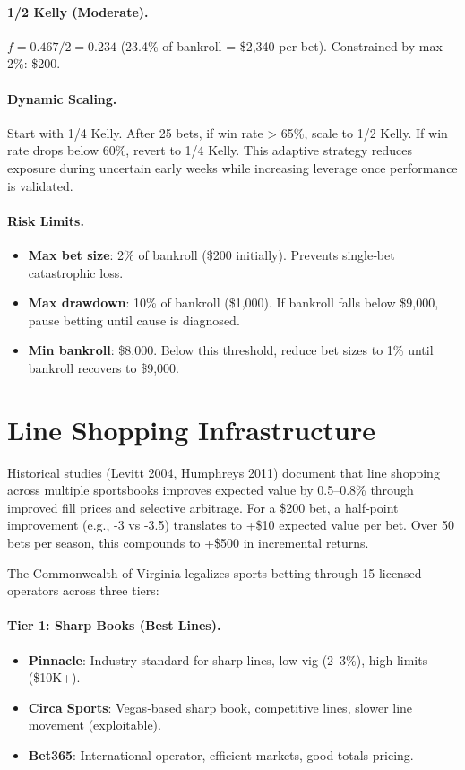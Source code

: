 \paragraph{1/2 Kelly (Moderate).}
$f = 0.467 / 2 = 0.234$ (23.4\% of bankroll = \$2,340 per bet). Constrained by max 2\%: \$200.

\paragraph{Dynamic Scaling.}
Start with 1/4 Kelly. After 25 bets, if win rate > 65\%, scale to 1/2 Kelly. If win rate drops below 60\%, revert to 1/4 Kelly. This adaptive strategy reduces exposure during uncertain early weeks while increasing leverage once performance is validated.

\paragraph{Risk Limits.}
\begin{itemize}
\item \textbf{Max bet size}: 2\% of bankroll (\$200 initially). Prevents single‑bet catastrophic loss.
\item \textbf{Max drawdown}: 10\% of bankroll (\$1,000). If bankroll falls below \$9,000, pause betting until cause is diagnosed.
\item \textbf{Min bankroll}: \$8,000. Below this threshold, reduce bet sizes to 1\% until bankroll recovers to \$9,000.
\end{itemize}

\section{Line Shopping Infrastructure}
\label{sec:line_shopping}

Historical studies (Levitt 2004, Humphreys 2011) document that line shopping across multiple sportsbooks improves expected value by 0.5--0.8\% through improved fill prices and selective arbitrage. For a \$200 bet, a half‑point improvement (e.g., -3 vs -3.5) translates to +\$10 expected value per bet. Over 50 bets per season, this compounds to +\$500 in incremental returns.

The Commonwealth of Virginia legalizes sports betting through 15 licensed operators across three tiers:

\paragraph{Tier 1: Sharp Books (Best Lines).}
\begin{itemize}
\item \textbf{Pinnacle}: Industry standard for sharp lines, low vig (2--3\%), high limits (\$10K+).
\item \textbf{Circa Sports}: Vegas‑based sharp book, competitive lines, slower line movement (exploitable).
\item \textbf{Bet365}: International operator, efficient markets, good totals pricing.
\end{itemize}

